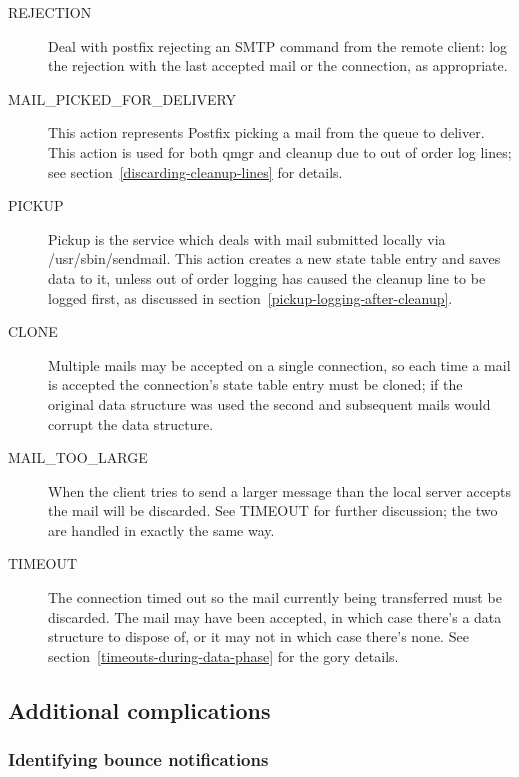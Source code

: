 \documentclass[a4paper,12pt,draft]{article}
\begin{document}
\begin{description}
    \item [REJECTION] Deal with postfix rejecting an SMTP command from the
        remote client: log the rejection with the last accepted mail or the
        connection, as appropriate.

    \item [MAIL\_PICKED\_FOR\_DELIVERY] This action represents Postfix
        picking a mail from the queue to deliver. This action is used for
        both qmgr and cleanup due to out of order log lines; see
        section~\ref{discarding-cleanup-lines} for details.

    \item [PICKUP] Pickup is the service which deals with mail submitted
        locally via /usr/sbin/sendmail. This action creates a new state
        table entry and saves data to it, unless out of order logging has
        caused the cleanup line to be logged first, as discussed in
        section~\ref{pickup-logging-after-cleanup}.

    \item [CLONE] Multiple mails may be accepted on a single connection, so
        each time a mail is accepted the connection's state table entry
        must be cloned; if the original data structure was used the second
        and subsequent mails would corrupt the data structure.

    \item [MAIL\_TOO\_LARGE] When the client tries to send a larger message
        than the local server accepts the mail will be discarded.  See
        TIMEOUT for further discussion; the two are handled in exactly the
        same way.

    \item [TIMEOUT] The connection timed out so the mail currently being
        transferred must be discarded. The mail may have been accepted, in
        which case there's a data structure to dispose of, or it may not in
        which case there's none. See
        section~\ref{timeouts-during-data-phase} for the gory details.

\end{description}

\subsection{Additional complications}

\subsubsection{Identifying bounce notifications}
\end{document}
